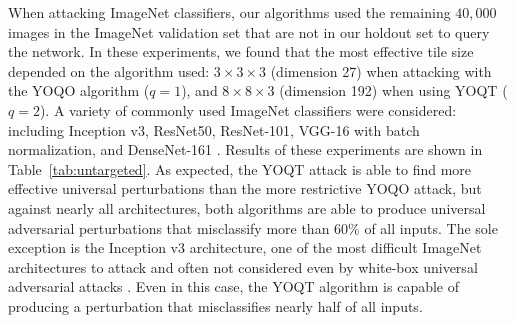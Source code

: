 \documentclass[letterpaper]{article}
\begin{document}
	When attacking ImageNet classifiers, our algorithms used the remaining $40,000$ images in the ImageNet validation set that are not in our holdout set to query the network. In these experiments, we found that the most effective tile size depended on the algorithm used: $3 \times 3 \times 3$ (dimension 27) when attacking with the YOQO algorithm ($q=1$), and $8 \times 8 \times 3$ (dimension 192) when using YOQT ($q=2$). A variety of commonly used ImageNet classifiers were considered: including Inception v3, ResNet50, ResNet-101, VGG-16 with batch normalization, and DenseNet-161 \cite{inception, resnet, vgg, densenet}. Results of these experiments are shown in Table~\ref{tab:untargeted}. As expected, the YOQT attack is able to find more effective universal perturbations than the more restrictive YOQO attack, but against nearly all architectures, both algorithms are able to produce universal adversarial perturbations that misclassify more than 60\% of all inputs. The sole exception is the Inception v3 architecture, one of the most difficult ImageNet architectures to attack and often not considered even by white-box universal adversarial attacks \cite{chaubey2020universal}. Even in this case, the YOQT algorithm is capable of producing a perturbation that misclassifies nearly half of all inputs. 
	
	
	
\end{document}
